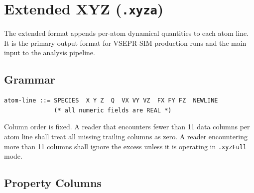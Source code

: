 \documentclass[11pt, a4paper, oneside]{article}
\begin{document}
\section{Extended XYZ (\texttt{.xyza})}
\label{sec:xyza}

The extended format appends per-atom dynamical quantities to each atom line.
It is the primary output format for VSEPR-SIM production runs and the main
input to the analysis pipeline.

\subsection{Grammar}
\label{sec:xyza_grammar}

\begin{lstlisting}[caption={Extended XYZ atom-line grammar.}]
atom-line ::= SPECIES  X Y Z  Q  VX VY VZ  FX FY FZ  NEWLINE
              (* all numeric fields are REAL *)
\end{lstlisting}

Column order is fixed. A reader that encounters fewer than 11 data columns
per atom line shall treat all missing trailing columns as zero. A reader
encountering more than 11 columns shall ignore the excess unless it is
operating in \texttt{.xyzFull} mode.

\subsection{Property Columns}
\label{sec:xyza_cols}
\end{document}
